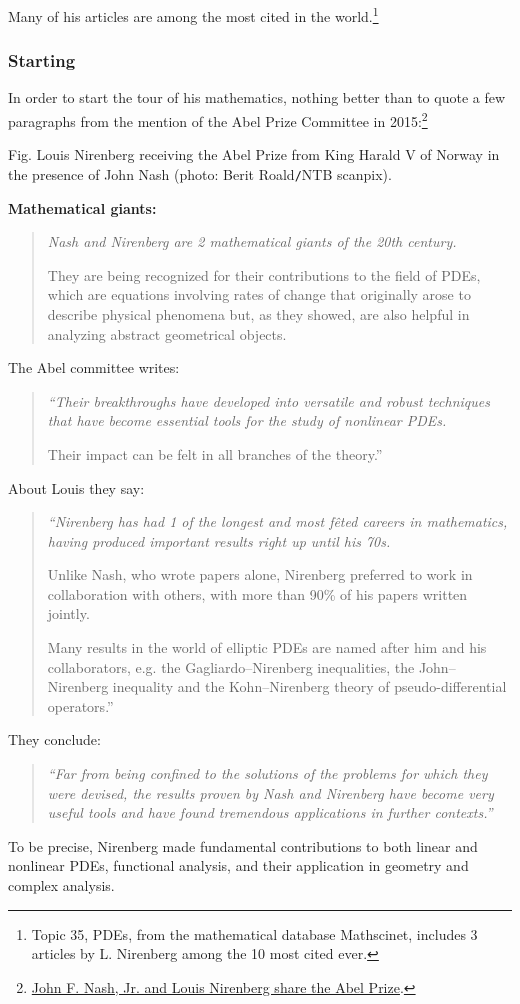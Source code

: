 \documentclass{article}
\begin{document}
Many of his articles are among the most cited in the world.\footnote{Topic 35, PDEs, from the mathematical database Mathscinet, includes 3 articles by L. Nirenberg among the 10 most cited ever.}

\subsubsection{Starting}
In order to start the tour of his mathematics, nothing better than to quote a few paragraphs from the mention of the Abel Prize Committee in 2015:\footnote{\href{https://www.abelprize.no/nyheter/vis.html?tid=63589}{John F. Nash, Jr. and Louis Nirenberg share the Abel Prize}.}

\textsf{Fig. Louis Nirenberg receiving the Abel Prize from King Harald V of Norway in the presence of John Nash (photo: Berit Roald{\tt/}NTB scanpix).}

\textbf{Mathematical giants:}
\begin{quotation}\it
	Nash and Nirenberg are 2 mathematical giants of the 20th century.
	
	They are being recognized for their contributions to the field of PDEs, which are equations involving rates of change that originally arose to describe physical phenomena but, as they showed, are also helpful in analyzing abstract geometrical objects.
\end{quotation}
The Abel committee writes:
\begin{quotation}\it
	``Their breakthroughs have developed into versatile and robust techniques that have become essential tools for the study of nonlinear PDEs.
	
	Their impact can be felt in all branches of the theory.''
\end{quotation}
About Louis they say:
\begin{quotation}\it
	``Nirenberg has had 1 of the longest and most f\^eted careers in mathematics, having produced important results right up until his 70s.
	
	Unlike Nash, who wrote papers alone, Nirenberg preferred to work in collaboration with others, with more than 90\% of his papers written jointly.
	
	Many results in the world of elliptic PDEs are named after him and his collaborators, e.g. the Gagliardo--Nirenberg inequalities, the John--Nirenberg inequality and the Kohn--Nirenberg theory of pseudo-differential operators.''
\end{quotation}
They conclude:
\begin{quotation}\it
	``Far from being confined to the solutions of the problems for which they were devised, the results proven by Nash and Nirenberg have become very useful tools and have found tremendous applications in further contexts.''
\end{quotation}
To be precise, Nirenberg made fundamental contributions to both linear and nonlinear PDEs, functional analysis, and their application in geometry and complex analysis.
\end{document}
